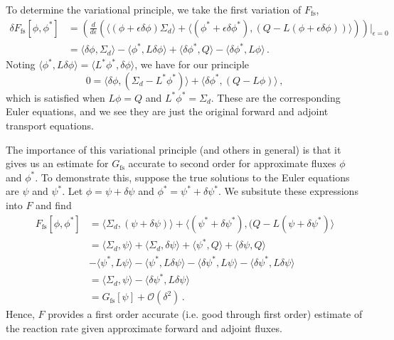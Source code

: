 To determine the variational principle, we take the first variation of $F_{\text{fs}}$,
\begin{equation}
 \begin{split}
  \delta F_{\text{fs}} [\phi,\phi^*] &= 
    \left ( \frac{d}{d\epsilon} 
            \left ( \langle (\phi+\epsilon \delta \phi) \Sigma_d \rangle + 
                    \langle (\phi^* + \epsilon \delta \phi^*), 
                            (Q-L(\phi+\epsilon \delta \phi)) \rangle 
            \right ) 
    \right ) \Bigg|_{\epsilon=0} \\
   &= \langle \delta \phi, \Sigma_d \rangle - 
      \langle \phi^*,L \delta \phi \rangle + 
      \langle \delta \phi^*, Q \rangle - 
      \langle \delta \phi^*, L \phi \rangle \, .
 \end{split}
\end{equation}
Noting 
$\langle \phi^*,L\delta \phi \rangle = \langle L^* \phi^*,\delta \phi \rangle$, 
we have for our principle 
\begin{equation}
 0 = \langle \delta \phi, (\Sigma_d - L^* \phi^*) \rangle + 
     \langle \delta \phi^*, (Q-L\phi) \rangle \, ,
\end{equation}
which is satisfied when $L\phi = Q$ and $L^* \phi^* = \Sigma_d$.  These are 
the corresponding Euler equations, and we see they are just the original 
forward and adjoint transport equations.

The importance of this variational principle (and others in general) is that 
it gives us an estimate for $G_{\text{fs}}$ accurate to second order for approximate 
fluxes $\phi$ and $\phi^*$.  To demonstrate this, suppose the true solutions 
to the Euler equations are $\psi$ and $\psi^*$.  
Let $\phi = \psi + \delta \psi$ and $\phi^* = \psi^* + \delta \psi^*$.  
We subsitute these expressions into $F$ and find
\begin{equation}
 \begin{split}
    F_{\text{fs}} [\phi,\phi^*] &= 
      \langle \Sigma_d, (\psi+\delta \psi) \rangle + 
      \langle (\psi^*+\delta \psi^*),(Q-L(\psi+\delta \psi^*) \rangle \\
    &= \langle \Sigma_d,\psi \rangle + 
       \langle \Sigma_d, \delta \psi \rangle + 
       \langle \psi^*,Q \rangle + 
       \langle \delta \psi,Q \rangle  \\ 
    &- \langle \psi^*, L\psi \rangle - 
       \langle \psi^*, L\delta \psi \rangle - 
       \langle \delta \psi^*, L\psi \rangle - 
       \langle \delta \psi^*, L\delta \psi \rangle \\
    &= \langle \Sigma_d, \psi \rangle - 
       \langle \delta \psi^*, L\delta \psi \rangle \\
    &= G_{\text{fs}}[\psi] + \mathcal{O}(\delta^2) \, .
 \end{split}
 \label{eq:secondorderfs}
\end{equation}
Hence, $F$ provides a first order accurate (i.e. good through first order) 
estimate of the reaction rate given approximate forward and adjoint fluxes.


